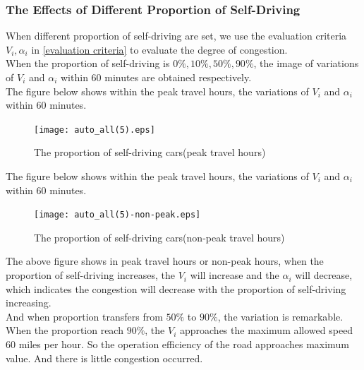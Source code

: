 \documentclass{mcmthesis}
\begin{document}
\subsubsection{The Effects of Different Proportion of Self-Driving }
When different proportion of self-driving are set, we use the evaluation criteria $V_{i}, \alpha_{i}$ in \ref{evaluation criteria} to evaluate the degree of congestion. \\
\indent When the proportion of self-driving is $0\%, 10\%, 50\%, 90\%$, the image of variations of $V_{i}$ and $\alpha_{i}$ within 60 minutes are obtained respectively.\\
\indent The figure below shows within the peak travel hours, the variations of $V_{i}$ and $\alpha_{i}$ within 60 minutes.\\
\begin{figure}[H]
	\centerline{\texttt{[image: auto\_all(5).eps]}}
	\caption{The proportion of self-driving cars(peak travel hours)}	
\end{figure}
\indent The figure below shows within the peak travel hours, the variations of $V_{i}$ and $\alpha_{i}$ within 60 minutes.\\
\begin{figure}[H]
	\centerline{\texttt{[image: auto\_all(5)-non-peak.eps]}}
	\caption{The proportion of self-driving cars(non-peak travel hours)}	
\end{figure}
\indent The above figure shows in peak travel hours or non-peak hours, when the proportion of self-driving increases, the $V_{i}$ will increase and the $\alpha_{i}$ will decrease, which indicates the congestion will decrease with the proportion of self-driving increasing.\\
\indent And when proportion transfers from $50\% $ to $90\% $, the variation is remarkable. When the proportion reach $90\%$, the $V_{i}$ approaches the maximum allowed speed 60 miles per hour. So the operation efficiency of the road approaches maximum value. And there is little congestion occurred. \\
\end{document}
